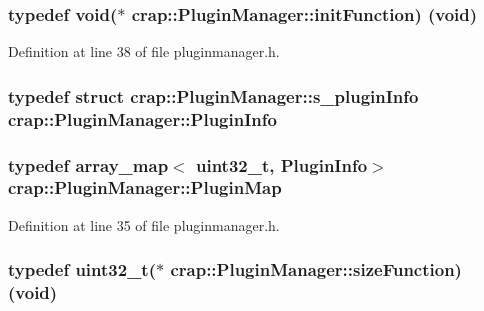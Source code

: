 \subsubsection[{init\+Function}]{\setlength{\rightskip}{0pt plus 5cm}typedef void($\ast$ crap\+::\+Plugin\+Manager\+::init\+Function) (void)}\label{classcrap_1_1_plugin_manager_abfa7013bbf59b2f12368d2a13f7595b8}


Definition at line 38 of file pluginmanager.\+h.

\hypertarget{classcrap_1_1_plugin_manager_afbb43a9409aeca513d85df3af9764c55}{}
\subsubsection[{Plugin\+Info}]{\setlength{\rightskip}{0pt plus 5cm}typedef struct {\bf crap\+::\+Plugin\+Manager\+::s\+\_\+plugin\+Info}
	 {\bf crap\+::\+Plugin\+Manager\+::\+Plugin\+Info}}\label{classcrap_1_1_plugin_manager_afbb43a9409aeca513d85df3af9764c55}
\hypertarget{classcrap_1_1_plugin_manager_ac7816f692d9a008ed7198aacd673d595}{}
\subsubsection[{Plugin\+Map}]{\setlength{\rightskip}{0pt plus 5cm}typedef {\bf array\+\_\+map}$<$ uint32\+\_\+t, {\bf Plugin\+Info}$>$ {\bf crap\+::\+Plugin\+Manager\+::\+Plugin\+Map}}\label{classcrap_1_1_plugin_manager_ac7816f692d9a008ed7198aacd673d595}


Definition at line 35 of file pluginmanager.\+h.

\hypertarget{classcrap_1_1_plugin_manager_a0c83d358e4096b6a8b9bcce66e85b633}{}
\subsubsection[{size\+Function}]{\setlength{\rightskip}{0pt plus 5cm}typedef uint32\+\_\+t($\ast$ crap\+::\+Plugin\+Manager\+::size\+Function) (void)}\label{classcrap_1_1_plugin_manager_a0c83d358e4096b6a8b9bcce66e85b633}


